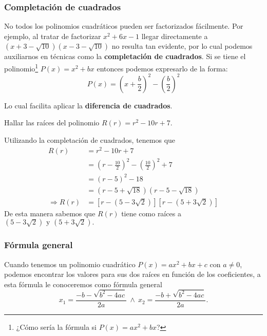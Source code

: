 \subsubsection{Completación de cuadrados}

No todos los polinomios cuadráticos pueden ser factorizados fácilmente.
Por ejemplo, al tratar de factorizar $x^2 + 6x - 1$ llegar directamente a $(x + 3 - \sqrt {10})(x-3-\sqrt {10})$ no resulta tan evidente, por lo cual podemos auxiliarnos en técnicas como la \textbf{completación de cuadrados}.
Si se tiene el polinomio\footnote{¿Cómo sería la fórmula si $P(x) = ax^2 + bx$?} $P(x) = x^2 + bx$ entonces podemos expresarlo de la forma:
\[
    P(x) = \left( x + \frac{b}{2} \right)^2 - \left( \frac{b}{2} \right)^2
\]

Lo cual facilita aplicar la \textbf{diferencia de cuadrados}.

\begin{section-example.tcb}
    Hallar las raíces del polinomio $R(r) = r^2 - 10r + 7.$
\end{section-example.tcb}
\begin{solution}
{
    Utilizando la completación de cuadrados, tenemos que
    \begin{align*}
        R(r) &= r^2 - 10r + 7\\
        &= \left( r - \frac{10}{2} \right)^2 - \left( \frac{10}{2} \right)^2 + 7\\
        &= \left( r - 5 \right)^2 - 18\\
        &= \left( r - 5 + \sqrt {18} \right)\left( r - 5 - \sqrt {18} \right)\\
        \Rightarrow R(r) &= \left[ r - \left( 5 - 3\sqrt {2} \right)\right]\left[ r - \left( 5 + 3\sqrt {2} \right)\right]
    \end{align*}
    De esta manera sabemos que $R(r)$ tiene como raíces a $\left( 5 - 3\sqrt {2} \right) \mbox{ y } \left( 5 + 3\sqrt {2} \right).$
}
\end{solution}


\subsubsection{Fórmula general}

Cuando tenemos un polinomio cuadrático $P(x) = ax^2 + bx + c$ con $a \neq 0$, podemos encontrar los valores para sus dos raíces en función de los coeficientes, a esta fórmula le conoceremos como fórmula general
\[
    x_1 = \frac{-b - \sqrt {b^2 - 4ac}}{2a}\ \land \ x_2 = \frac{-b + \sqrt {b^2 - 4ac}}{2a}.
\]

